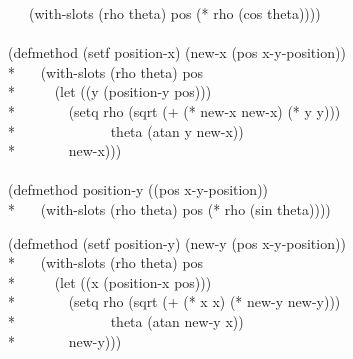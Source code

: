 \begin{defun}
\begin{lisp}
~~~(with-slots (rho theta) pos (* rho (cos theta)))) \\
\\
(defmethod (setf position-x) (new-x (pos x-y-position)) \\*
~~~(with-slots (rho theta) pos \\*
~~~~~(let ((y (position-y pos))) \\*
~~~~~~~(setq rho (sqrt (+ (* new-x new-x) (* y y))) \\*
~~~~~~~~~~~~~theta (atan y new-x)) \\*
~~~~~~~new-x))) \\
\\
(defmethod position-y ((pos x-y-position)) \\*
~~~(with-slots (rho theta) pos (* rho (sin theta))))
\end{lisp}
\begin{lisp}
(defmethod (setf position-y) (new-y (pos x-y-position)) \\*
~~~(with-slots (rho theta) pos \\*
~~~~~(let ((x (position-x pos))) \\*
~~~~~~~(setq rho (sqrt (+ (* x x) (* new-y new-y))) \\*
~~~~~~~~~~~~~theta (atan new-y x)) \\*
~~~~~~~new-y)))
\end{lisp}
\end{defun}

